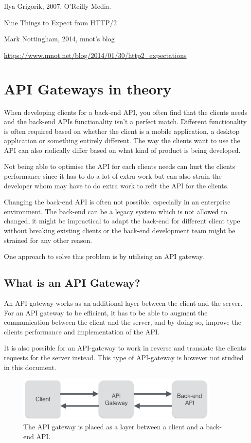 \documentclass{cslthse-msc}
\begin{document}
Ilya Grigorik, 2007, O'Reilly Media.

\vspace{5mm}
\noindent Nine Things to Expect from HTTP/2

Mark Nottingham, 2014, mnot's blog

\url{https://www.mnot.net/blog/2014/01/30/http2_expectations}

\chapter{API Gateways in theory}
When developing clients for a back-end API, you often find that the clients needs and the back-end APIs functionality isn't a perfect match. Different functionality is often required based on whether the client is a mobile application, a desktop application or something entirely different. The way the clients want to use the API can also radically differ based on what kind of product is being developed.

Not being able to optimise the API for each clients needs can hurt the clients performance since it has to do a lot of extra work but can also strain the developer whom may have to do extra work to refit the API for the clients.

Changing the back-end API is often not possible, especially in an enterprise environment. The back-end can be a legacy system which is not allowed to changed, it might be impractical to adapt the back-end for different client type without breaking existing clients or the back-end development team might be strained for any other reason.

One approach to solve this problem is by utilising an API gateway.

\section{What is an API Gateway?}
An API gateway works as an additional layer between the client and the server. For an API gateway to be efficient, it has to be able to augment the communication between the client and the server, and by doing so, improve the clients performance and implementation of the API.

It is also possible for an API-gateway to work in reverse and translate the clients requests for the server instead. This type of API-gateway is however not studied in this document.

\begin{figure}[H]
  \centering
    \begin{center}
      \includegraphics[width=0.9\textwidth]{images/api_gateway.png}
    \end{center}
  \caption{The API gateway is placed as a layer between a client and a back-end API.}
\end{figure}
\end{document}
